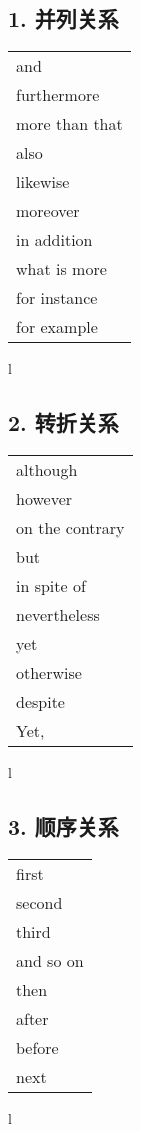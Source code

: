 \subsection{1. 并列关系}

\begin{tabular}{l}
    and            \\
    furthermore    \\
    more than that \\
    also           \\
    likewise       \\
    moreover       \\
    in addition    \\
    what is more   \\
    for instance   \\
    for example    \\
\end{tabular}{l}

\subsection{2. 转折关系}

\begin{tabular}{l}
    although        \\
    however         \\
    on the contrary \\
    but             \\
    in spite of     \\
    nevertheless    \\
    yet             \\
    otherwise       \\
    despite         \\
    Yet,            \\
\end{tabular}{l}

\subsection{3. 顺序关系}

\begin{tabular}{l}
    first     \\
    second    \\
    third     \\
    and so on \\
    then      \\
    after     \\
    before    \\
    next      \\
\end{tabular}{l}


